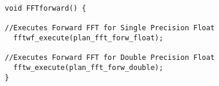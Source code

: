 \lstset{framesep=-10pt, xleftmargin=-10pt}
\begin{lstlisting}[caption={FHEW: FFT Forward Function},label={listing:3.8.4}]
void FFTforward() {

//Executes Forward FFT for Single Precision Float
  fftwf_execute(plan_fft_forw_float); 
 
//Executes Forward FFT for Double Precision Float
  fftw_execute(plan_fft_forw_double); 
}

\end{lstlisting}




